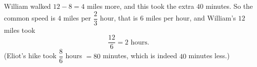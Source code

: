 William walked $12-8=4$ miles more, and this took the extra $40$ minutes. So the common speed is $4$ miles per $\dfrac{2}{3}$ hour, that is $6$ miles per hour, and William's $12$ miles took
\[
\dfrac{12}{6}=\boxed{2\text{ hours}}.
\]
(Eliot's hike took $\dfrac{8}{6}$ hours $=80$ minutes, which is indeed $40$ minutes less.)
